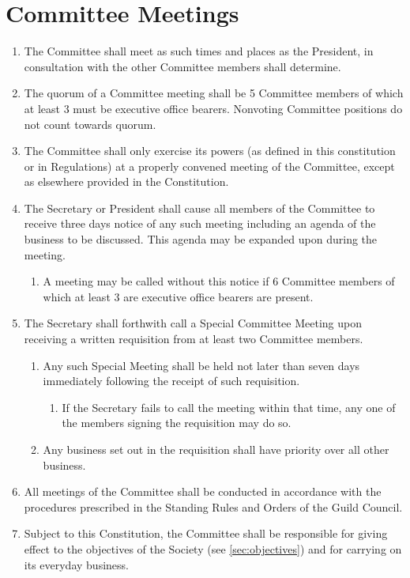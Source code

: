 \documentclass[a4paper]{article}
\newenvironment{enumsection}[1]{\section{#1} \begin{enumerate}[ref=\thesection.\theenumi]}{\end{enumerate}}
\begin{document}
\begin{enumsection}{Committee Meetings}
    \item The Committee shall meet as such times and places as the President, in consultation with the other Committee members shall determine.
    \item The quorum of a Committee meeting shall be 5 Committee members of which at least 3 must be executive office bearers. Nonvoting Committee positions do not count towards quorum.
    \item The Committee shall only exercise its powers (as defined in this constitution or in Regulations) at a properly convened meeting of the Committee, except as elsewhere provided in the Constitution.
    \item The Secretary or President shall cause all members of the Committee to receive three days notice of any such meeting including an agenda of the business to be discussed. This agenda may be expanded upon during the meeting.
    \begin{enumerate}
        \item A meeting may be called without this notice if 6 Committee members of which at least 3 are executive office bearers are present.
    \end{enumerate}
    \item The Secretary shall forthwith call a Special Committee Meeting upon receiving a written requisition from at least two Committee members.
    \begin{enumerate}
        \item Any such Special Meeting shall be held not later than seven days immediately following the receipt of such requisition.
        \begin{enumerate}
            \item If the Secretary fails to call the meeting within that time, any one of the members signing the requisition may do so. 
        \end{enumerate}
        \item Any business set out in the requisition shall have priority over all other business.
    \end{enumerate}
    \item All meetings of the Committee shall be conducted in accordance with the procedures prescribed in the Standing Rules and Orders of the Guild Council.
    \item Subject to this Constitution, the Committee shall be responsible for giving effect to the objectives of the Society (see \cref{sec:objectives}) and for carrying on its everyday business.

\end{enumsection}
\end{document}
